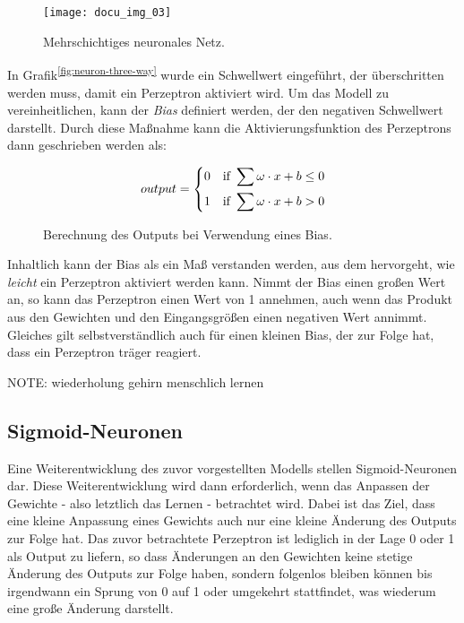 \begin{figure}[H]
    \centering
    \texttt{[image: docu\_img\_03]}
    \caption{Mehrschichtiges neuronales Netz.}
    \label{fig:multi-layer-net}
\end{figure}

In Grafik\textsuperscript{\ref{fig:neuron-three-way}} wurde ein Schwellwert eingeführt, der überschritten werden muss, damit ein Perzeptron aktiviert wird. Um das Modell zu vereinheitlichen, kann der \textit{Bias} definiert werden, der den negativen Schwellwert darstellt. Durch diese Maßnahme kann die Aktivierungsfunktion des Perzeptrons dann geschrieben werden als:

\begin{figure}[H]
    \centering
    \[ output =
          \begin{dcases}
            0 \quad \text{if } \sum \omega \cdot x + b \leq 0 \\
            1 \quad \text{if } \sum \omega \cdot x + b > 0
          \end{dcases}
    \]
    \caption{Berechnung des Outputs bei Verwendung eines Bias.}
    \label{fig:bias-calculation}
\end{figure}

Inhaltlich kann der Bias als ein Maß verstanden werden, aus dem hervorgeht, wie \textit{leicht} ein Perzeptron aktiviert werden kann. Nimmt der Bias einen großen Wert an, so kann das Perzeptron einen Wert von 1 annehmen, auch wenn das Produkt aus den Gewichten und den Eingangsgrößen einen negativen Wert annimmt. Gleiches gilt selbstverständlich auch für einen kleinen Bias, der zur Folge hat, dass ein Perzeptron träger reagiert.

NOTE:
wiederholung gehirn menschlich lernen

\subsection{Sigmoid-Neuronen}

Eine Weiterentwicklung des zuvor vorgestellten Modells stellen Sigmoid-Neuronen dar. Diese Weiterentwicklung wird dann erforderlich, wenn das Anpassen der Gewichte - also letztlich das Lernen - betrachtet wird. Dabei ist das Ziel, dass eine kleine Anpassung eines Gewichts auch nur eine kleine Änderung des Outputs zur Folge hat. Das zuvor betrachtete Perzeptron ist lediglich in der Lage 0 oder 1 als Output zu liefern, so dass Änderungen an den Gewichten keine stetige Änderung des Outputs zur Folge haben, sondern folgenlos bleiben können bis irgendwann ein Sprung von 0 auf 1 oder umgekehrt stattfindet, was wiederum eine große Änderung darstellt.

